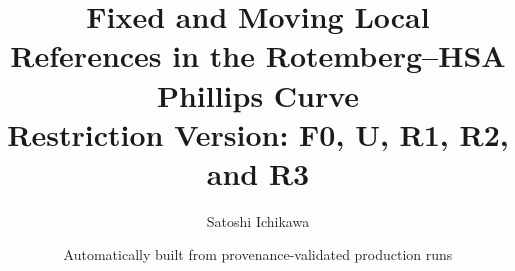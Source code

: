 \documentclass[11pt]{article}
\title{\textbf{Fixed and Moving Local References in the Rotemberg--HSA Phillips Curve}\\[3pt]
\large Restriction Version: F0, U, R1, R2, and R3}
\author{Satoshi Ichikawa}
\date{Automatically built from provenance-validated production runs}
\begin{document}
\providecommand{\TheorySampleStart}{??}
\providecommand{\TheorySampleEnd}{??}
\providecommand{\TheoryObservationCount}{??}
\providecommand{\TheoryZetaZero}{??}
\providecommand{\TheoryMuZero}{??}
\providecommand{\TheoryMarginalCostLoading}{??}
\providecommand{\TheoryNZeroAnchor}{??}
\providecommand{\TheoryPriorSpec}{??}
\providecommand{\TheoryCodeRevision}{??}
\providecommand{\TheoryFZeroKappaZero}{??}
\providecommand{\TheoryFZeroThetaZero}{??}
\providecommand{\TheoryFZeroRmse}{??}
\providecommand{\TheoryFZeroConditionalDIC}{??}
\providecommand{\TheoryFZeroFreeCoefficients}{??}
\providecommand{\TheoryUKappaZero}{??}
\providecommand{\TheoryUKappaN}{??}
\providecommand{\TheoryUKappaNLo}{??}
\providecommand{\TheoryUKappaNHi}{??}
\providecommand{\TheoryUThetaZero}{??}
\providecommand{\TheoryUGamma}{??}
\providecommand{\TheoryUGammaLo}{??}
\providecommand{\TheoryUGammaHi}{??}
\providecommand{\TheoryURestrictionValue}{??}
\providecommand{\TheoryUGapMean}{??}
\providecommand{\TheoryUGapLo}{??}
\providecommand{\TheoryUGapHi}{??}
\providecommand{\TheoryUProbGapPositive}{??}
\providecommand{\TheoryUImpliedZetaMedian}{??}
\providecommand{\TheoryUProbZetaAboveOne}{??}
\providecommand{\TheoryUStateRejectPercent}{??}
\providecommand{\TheoryUProbePercent}{??}
\providecommand{\TheoryURmse}{??}
\providecommand{\TheoryUConditionalDIC}{??}
\providecommand{\TheoryUFreeCoefficients}{??}
\providecommand{\TheoryROneKappaN}{??}
\providecommand{\TheoryROneKappaNLo}{??}
\providecommand{\TheoryROneKappaNHi}{??}
\providecommand{\TheoryROneDKappaDLogN}{??}
\providecommand{\TheoryROneThetaZero}{??}
\providecommand{\TheoryROneGamma}{??}
\providecommand{\TheoryROneRmse}{??}
\providecommand{\TheoryROneConditionalDIC}{??}
\providecommand{\TheoryROneFreeCoefficients}{??}
\providecommand{\TheoryROneStateRejectPercent}{??}
\providecommand{\TheoryROneProbePercent}{??}
\providecommand{\TheoryRTwoKappaN}{??}
\providecommand{\TheoryRTwoThetaZero}{??}
\providecommand{\TheoryRTwoGamma}{??}
\providecommand{\TheoryRTwoGammaLo}{??}
\providecommand{\TheoryRTwoGammaHi}{??}
\providecommand{\TheoryRTwoConditionalDIC}{??}
\providecommand{\TheoryRThreeKappaN}{??}
\providecommand{\TheoryRThreeKappaNLo}{??}
\providecommand{\TheoryRThreeKappaNHi}{??}
\providecommand{\TheoryRThreeThetaZero}{??}
\providecommand{\TheoryRThreeConditionalDIC}{??}
\providecommand{\TheoryWorstScalarESS}{??}
\providecommand{\TheoryWorstScalarRhat}{??}
\providecommand{\TheoryWorstPathESS}{??}
\providecommand{\TheoryWorstPathRhat}{??}
\end{document}
